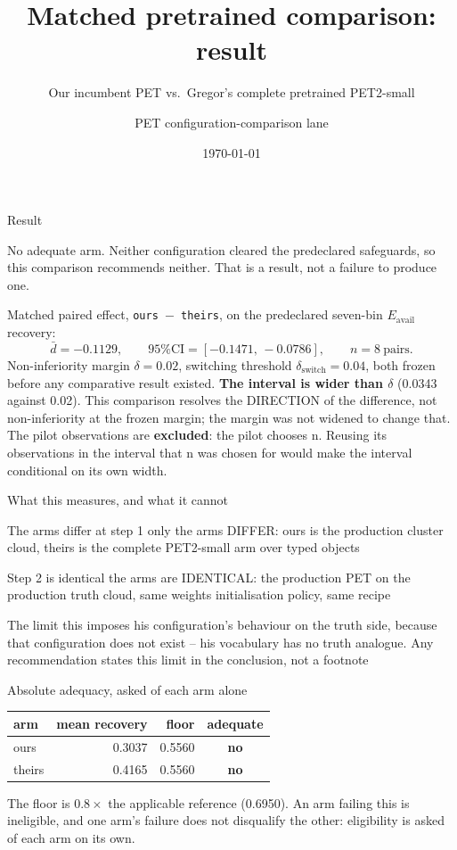 \documentclass[aspectratio=169,10pt]{beamer}
\title{Matched pretrained comparison: result}
\subtitle{Our incumbent PET vs.\ Gregor's complete pretrained PET2-small}
\author{PET configuration-comparison lane}
\date{\today}
\begin{document}
\frame{\titlepage}

\begin{frame}{Result}
\begin{block}{No adequate arm.}
Neither configuration cleared the predeclared safeguards, so this comparison recommends neither. That is a result, not a failure to produce one.
\end{block}
Matched paired effect, \texttt{ours $-$ theirs}, on the predeclared seven-bin
$E_{\mathrm{avail}}$ recovery:
\[
  \bar{d} = -0.1129, \qquad
  \text{95\% CI} = [-0.1471,\,
  -0.0786], \qquad
  n = 8\ \text{pairs}.
\]
Non-inferiority margin $\delta = 0.02$,
switching threshold $\delta_{\mathrm{switch}} =
0.04$, both frozen before any comparative
result existed.
\vfill
\textbf{The interval is wider than $\delta$} (0.0343 against 0.02). This comparison resolves the DIRECTION of the difference, not non-inferiority at the frozen margin; the margin was not widened to change that.
\vfill
\footnotesize The pilot observations are \textbf{excluded}:
the pilot chooses n. Reusing its observations in the interval that n was chosen for would make the interval conditional on its own width.
\end{frame}

\begin{frame}{What this measures, and what it cannot}
\begin{block}{The arms differ at step 1 only}
the arms DIFFER: ours is the production cluster cloud, theirs is the complete PET2-small arm over typed objects
\end{block}
\begin{block}{Step 2 is identical}
the arms are IDENTICAL: the production PET on the production truth cloud, same weights initialisation policy, same recipe
\end{block}
\begin{alertblock}{The limit this imposes}
his configuration's behaviour on the truth side, because that configuration does not exist -- his vocabulary has no truth analogue. Any recommendation states this limit in the conclusion, not a footnote
\end{alertblock}
\end{frame}

\begin{frame}{Absolute adequacy, asked of each arm alone}
\begin{center}
\begin{tabular}{lrrc}
\toprule
arm & mean recovery & floor & adequate \\
\midrule
ours & 0.3037 &
  0.5560 &
  \textbf{no} \\
theirs & 0.4165 &
  0.5560 &
  \textbf{no} \\
\bottomrule
\end{tabular}
\end{center}
The floor is $0.8\times$ the
applicable reference (0.6950).
\vfill
\footnotesize An arm failing this is ineligible, and one arm's failure does not
disqualify the other: eligibility is asked of each arm on its own.
\end{frame}
\end{document}
